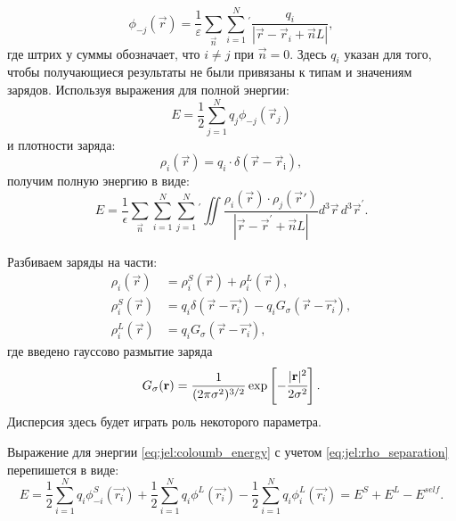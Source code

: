\begin{equation}
    \label{eq:jel:phi_no_j}
    \phi_{-j}(\vec{r})=\frac{1}{\varepsilon} \sum_{\vec{n}} \sum_{i=1}^{N} {}^\prime \frac{q_{i}}{\left|\vec{r}-\vec{r}_{i}+\vec{n} L\right|},
\end{equation}
где штрих у суммы обозначает, что $i \neq j$ при $\vec{n} = 0$.
Здесь $q_i$ указан для того, чтобы получающиеся результаты не были привязаны к типам и значениям зарядов.
Используя выражения для полной энергии:
\begin{equation}
    \label{eq:jel:coloumb_energy}
    E = \frac{1}{2} \sum_{j=1}^{N} q_{j} \phi_{-j}\left(\vec{r}_j\right)
\end{equation}
и плотности заряда:
\begin{equation}
    \rho_{i}(\vec{r})=q_{i} \cdot \delta\left(\vec{r}-\vec{r}_{\mathrm{i}}\right),
\end{equation}
получим полную энергию в виде:
\begin{equation}
    \label{eq:jel:ewald_E_coloumb_total}
    E = \frac{1}{\epsilon} \sum_{\vec{n}} \sum_{i=1}^{N} \sum_{j=1}^{N} {}^\prime \iint \frac{\rho_{i}(\vec{r}) \cdot
    \rho_{j}\left(\vec{r}'\right)}{\left|\vec{r}-\vec{r}^{\prime}+\vec{n} L\right|} d^3 \vec{r}\, d^3 \vec{r}^{\prime}.
\end{equation}

Разбиваем заряды на части:
\begin{equation}
\label{eq:jel:rho_separation}
\begin{aligned}
    \rho_i (\vec{r}) & = \rho_i^S (\vec{r}) + \rho_i^L (\vec{r}), \\
    \rho_i^S (\vec{r}) & = q_i \delta(\vec{r} - \vec{r_i}) - q_i G_\sigma (\vec{r} - \vec{r_i}), \\
    \rho_i^L (\vec{r}) & = q_i G_\sigma (\vec{r} - \vec{r_i}),
\end{aligned}
\end{equation}
где введено гауссово размытие заряда
\begin{equation}
    \label{eq:jel:gauss_blur}
    G_\sigma (\vec{r}) = \frac{1}{(2\pi \sigma^2)^{3/2}} \exp \left[ - \cfrac{|\vec{r}|^2}{2\sigma^2} \right].
\end{equation}
Дисперсия здесь будет играть роль некоторого параметра.

Выражение для энергии \eqref{eq:jel:coloumb_energy} с учетом \eqref{eq:jel:rho_separation} перепишется в виде:
\begin{equation}
    \label{eq:jel:E_separation}
    E = \frac{1}{2} \sum_{i=1}^N q_i \phi_{-i}^S (\vec{r_i}) + \frac{1}{2} \sum_{i=1}^N q_i \phi^L (\vec{r_i}) - \frac{1}{2} \sum_{i=1}^N q_i \phi_i^L (\vec{r_i})
    = E^S + E^L - E^{self}.
\end{equation}

